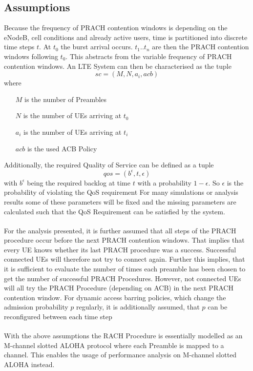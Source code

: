 \documentclass[conference]{IEEEtran}
\begin{document}
\subsection{Assumptions}\label{assumptions_analysis}

Because the frequency of PRACH contention windows is depending on the eNodeB, cell conditions and already active users, time is partitioned into discrete time steps $t$.
At $t_0$ the burst arrival occurs.
$t_1 .. t_n$ are then the PRACH contention windows following $t_0$.
This abstracts from the variable frequency of PRACH contention windows.
An LTE System can then be characterised as the tuple \[sc = (M, N, a_i, acb)\]
where \begin{itemize}
          \item[$M$] is the number of Preambles
          \item[$N$] is the number of UEs arriving at $t_0$
          \item[$a_i$] is the number of UEs arriving at $t_i$
          \item[$acb$] is the used ACB Policy
\end{itemize}

Additionally, the required Quality of Service can be defined as a tuple \[qos = (b^\epsilon, t, \epsilon)\]
with $b^\epsilon$ being the required backlog at time $t$ with a probability $1-\epsilon$.
So $\epsilon$ is the probability of violating the QoS requirement
For many simulations or analysis results some of these parameters will be fixed and the missing parameters are calculated such that the QoS Requirement can be satisfied by the system.\\\\
For the analysis presented, it is further assumed that all steps of the PRACH procedure occur before the next PRACH contention windows.
That implies that every UE knows whether its last PRACH procedure was a success.
Successful connected UEs will therefore not try to connect again.
Further this implies, that it is sufficient to evaluate the number of times each preamble has been chosen to get the number of successful PRACH Procedures.
However, not connected UEs will all try the PRACH Procedure (depending on ACB) in the next PRACH contention window.
For dynamic access barring policies, which change the admission probability $p$ regularly,  it is additionally assumed, that $p$ can be reconfigured between each time step\\\\
With the above assumptions the RACH Procedure is essentially modelled as an M-channel slotted ALOHA protocol where each Preamble is mapped to a channel.
This enables the usage of performance analysis on M-channel slotted ALOHA instead.
\end{document}
